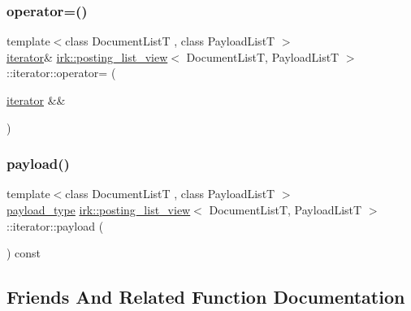 \subsubsection{\texorpdfstring{operator=()}{operator=()}\hspace{0.1cm}{\footnotesize\ttfamily [2/2]}}
{\footnotesize\ttfamily template$<$class Document\+ListT , class Payload\+ListT $>$ \\
\mbox{\hyperlink{classirk_1_1posting__list__view_1_1iterator}{iterator}}\& \mbox{\hyperlink{classirk_1_1posting__list__view}{irk\+::posting\+\_\+list\+\_\+view}}$<$ Document\+ListT, Payload\+ListT $>$\+::iterator\+::operator= (\begin{DoxyParamCaption}\item[{\mbox{\hyperlink{classirk_1_1posting__list__view_1_1iterator}{iterator}} \&\&}]{ }\end{DoxyParamCaption})\hspace{0.3cm}{\ttfamily [default]}}

\mbox{\label{classirk_1_1posting__list__view_1_1iterator_ae7ecff2bd65f5f029446892416ed8c68}} 
\subsubsection{\texorpdfstring{payload()}{payload()}}
{\footnotesize\ttfamily template$<$class Document\+ListT , class Payload\+ListT $>$ \\
\mbox{\hyperlink{classirk_1_1posting__list__view_a1c394061061a8eeeab98cb228f6cdde9}{payload\+\_\+type}} \mbox{\hyperlink{classirk_1_1posting__list__view}{irk\+::posting\+\_\+list\+\_\+view}}$<$ Document\+ListT, Payload\+ListT $>$\+::iterator\+::payload (\begin{DoxyParamCaption}{ }\end{DoxyParamCaption}) const\hspace{0.3cm}{\ttfamily [inline]}}



\subsection{Friends And Related Function Documentation}
\mbox{\label{classirk_1_1posting__list__view_1_1iterator_ac09f73e325921cc50ebcd96bed0f8096}} 
